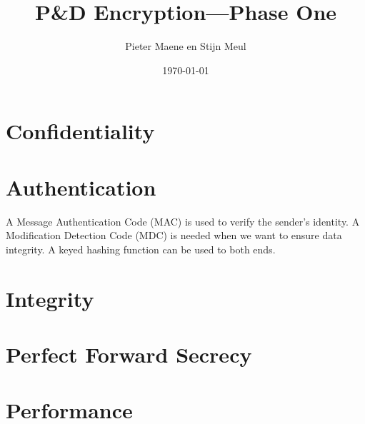 \documentclass[a4paper]{article}
\title{P\&D Encryption---Phase One}
\author{Pieter Maene en Stijn Meul}
\date{\today}
\begin{document}
\maketitle

\section{Confidentiality}

\section{Authentication}

A Message Authentication Code (MAC) is used to verify the sender's identity. A Modification Detection Code (MDC) is needed when we want to ensure data integrity. A keyed hashing function can be used to both ends.

\section{Integrity}

\section{Perfect Forward Secrecy}

\section{Performance}
\end{document}
